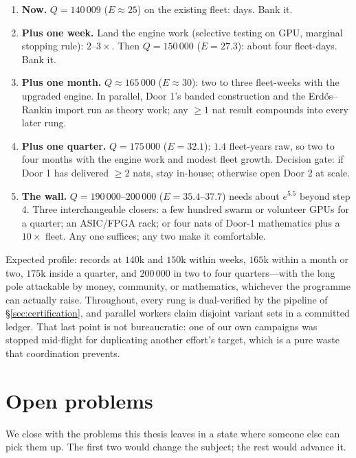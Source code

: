 \begin{enumerate}
\item \textbf{Now.} $Q=140\,009$ ($E\approx25$) on the existing fleet: days.
Bank it.
\item \textbf{Plus one week.} Land the engine work (selective testing on GPU,
marginal stopping rule): $2$--$3\times$. Then $Q=150\,000$ ($E=27.3$): about
four fleet-days. Bank it.
\item \textbf{Plus one month.} $Q\approx165\,000$ ($E\approx30$): two to three
fleet-weeks with the upgraded engine. In parallel, Door 1's banded construction
and the Erd\H{o}s--Rankin import run as theory work; any $\ge1$ nat result
compounds into every later rung.
\item \textbf{Plus one quarter.} $Q=175\,000$ ($E=32.1$): $1.4$ fleet-years raw,
so two to four months with the engine work and modest fleet growth. Decision
gate: if Door 1 has delivered $\ge2$ nats, stay in-house; otherwise open Door 2
at scale.
\item \textbf{The wall.} $Q=190\,000$--$200\,000$ ($E=35.4$--$37.7$) needs about
$e^{5.5}$ beyond step 4. Three interchangeable closers: a few hundred swarm or
volunteer GPUs for a quarter; an ASIC/FPGA rack; or four nats of Door-1
mathematics plus a $10\times$ fleet. Any one suffices; any two make it
comfortable.
\end{enumerate}

Expected profile: records at $140$k and $150$k within weeks, $165$k within a
month or two, $175$k inside a quarter, and $200\,000$ in two to four
quarters---with the long pole attackable by money, community, or mathematics,
whichever the programme can actually raise. Throughout, every rung is
dual-verified by the pipeline of \S\ref{sec:certification}, and parallel workers
claim disjoint variant sets in a committed ledger. That last point is not
bureaucratic: one of our own campaigns was stopped mid-flight for duplicating
another effort's target, which is a pure waste that coordination prevents.

\section{Open problems}

We close with the problems this thesis leaves in a state where someone else can
pick them up. The first two would change the subject; the rest would advance it.

